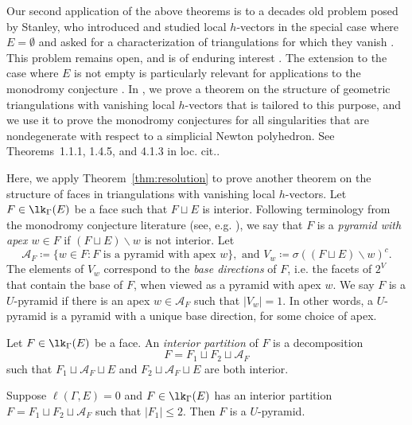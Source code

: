 Our second application of the above theorems is to a decades old problem posed by Stanley, who introduced and studied local $h$-vectors in the special case where $E = \emptyset$ and asked for a characterization of triangulations for which they vanish \cite[Problem~4.13]{Stanley92}. This problem remains open, and is of enduring interest \cite[Problem~2.12]{Athanasiadis16}. The extension to the case where $E$ is not empty is particularly relevant for applications to the monodromy conjecture \cite{Igusa78, DenefLoeser98, Stapledon17}. In \cite{LarsonPayneStapledon}, we prove a theorem on the structure of geometric triangulations with vanishing local $h$-vectors that is tailored to this purpose, and we use it to prove the monodromy conjectures for all singularities that are nondegenerate with respect to a simplicial Newton polyhedron.  See Theorems~1.1.1, 1.4.5, and 4.1.3 in loc. cit..

Here, we apply  Theorem~\ref{thm:resolution} to prove another theorem on the structure of faces in triangulations with vanishing local $h$-vectors.  Let $F \in \lk_\Gamma(E)$ be a face such that $F\sqcup E$ is interior. Following terminology from the monodromy conjecture literature (see, e.g. \cite{LemahieuVanProeyen11}), we say that $F$ is a \emph{pyramid with apex $w \in F$}  if $(F \sqcup E )  \smallsetminus w$ is not interior. Let $$\mathcal{A}_F  \coloneqq  \{ w \in F : F \mbox{ is a pyramid with apex } w \}, \mbox{ \ and \ } V_w  \coloneqq  \sigma( (F \sqcup E) \smallsetminus w)^c.$$
The elements of $V_w$ correspond to the \emph{base directions} of $F$, i.e. the facets of $2^V$ that contain the base of $F$, when viewed as a pyramid with apex $w$.  We say $F$ is a $U$-pyramid if there is an apex $w \in \mathcal{A}_F$ such that $|V_w|  = 1$. In other words, a $U$-pyramid is a pyramid with a unique base direction, for some choice of apex.

\begin{definition}
Let $F \in \lk_{\Gamma}(E)$ be a face.  An \emph{interior partition} of $F$ is a decomposition
\[
F = F_1 \sqcup F_2 \sqcup \mathcal{A}_F
\]
such that $F_1 \sqcup \mathcal{A}_F \sqcup E$ and $F_2 \sqcup \mathcal{A}_F \sqcup E$ are both interior.
\end{definition}

\begin{theorem}\label{thm:interiornonvanish}
Suppose $\ell(\Gamma,E) = 0$ and $F \in \lk_\Gamma(E)$ has an interior partition $F = F_1 \sqcup F_2 \sqcup \mathcal{A}_F$ such that $|F_1| \leq 2$.  Then $F$ is a $U$-pyramid.
\end{theorem}

